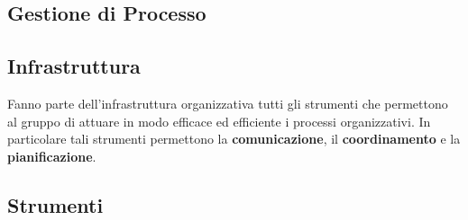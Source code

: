 \subsection{Gestione di Processo}
\subsection{Infrastruttura}
Fanno parte dell'infrastruttura organizzativa tutti gli strumenti che permettono al gruppo di attuare in modo efficace ed efficiente i processi organizzativi. In particolare tali strumenti permettono la \textbf{comunicazione}, il \textbf{coordinamento} e la \textbf{pianificazione}.

\subsection{Strumenti}
